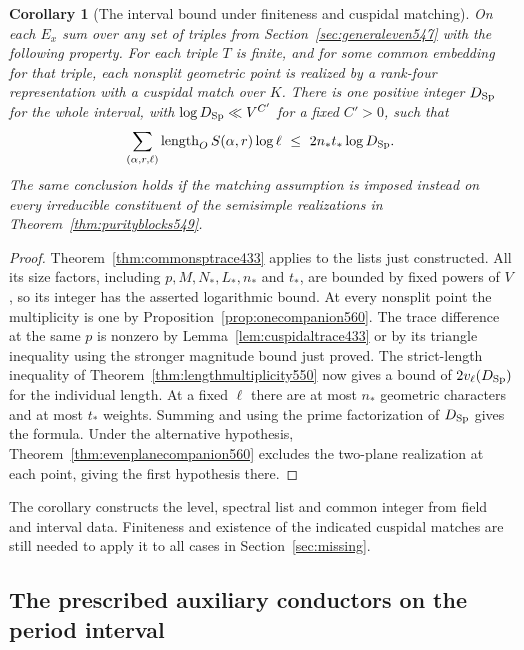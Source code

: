 \documentclass[a4paper,11pt]{article}
\newtheorem{corollary}[proposition]{Corollary}
\theoremstyle{definition}
\theoremstyle{remark}
\numberwithin{equation}{section}
\begin{document}
\begin{corollary}[The interval bound under finiteness and cuspidal matching]
\leavevmode\label{cor:uniformstrict561}
On each \(E_x\) sum over any set of triples from
Section~\ref{sec:generaleven547} with the following property.
For each triple \(T\) is finite, and for some common embedding
for that triple, each nonsplit geometric point is realized by
a rank-four representation with a cuspidal match over \(K\).
There is one positive integer \(D_{\rm Sp}\) for the whole
interval, with \(\log D_{\rm Sp}\ll V^{C'}\) for a fixed
\(C'>0\), such that
\[
 \sum_{(\alpha,r,\ell)}
     \operatorname{length}_O S(\alpha,r)\log\ell
                          \ \le\ 2n_*t_* \log D_{\rm Sp}.
\]
The same conclusion holds if the matching assumption is imposed
instead on every irreducible constituent of the semisimple
realizations in Theorem~\ref{thm:purityblocks549}.
\end{corollary}
\begin{proof}
Theorem~\ref{thm:commonsptrace433} applies to the lists just
constructed. All its size factors, including \(p,M,N_*,L_*,n_*\)
and \(t_*\), are bounded by fixed powers of \(V\), so its
integer has the asserted logarithmic bound. At every nonsplit
point the multiplicity is one by
Proposition~\ref{prop:onecompanion560}. The trace difference
at the same \(p\) is nonzero by Lemma~\ref{lem:cuspidaltrace433}
or by its triangle inequality using the stronger magnitude
bound just proved. The strict-length inequality of
Theorem~\ref{thm:lengthmultiplicity550} now gives a bound of
\(2v_\ell(D_{\rm Sp})\) for the individual length. At a
fixed \(\ell\) there are at most \(n_*\) geometric characters
and at most \(t_*\) weights. Summing and using the prime
factorization of \(D_{\rm Sp}\) gives the formula. Under the
alternative hypothesis, Theorem~\ref{thm:evenplanecompanion560}
excludes the two-plane realization at each point, giving the
first hypothesis there.
\end{proof}

The corollary constructs the level, spectral list and common
integer from field and interval data. Finiteness and existence
of the indicated cuspidal matches are still needed to apply it
to all cases in Section~\ref{sec:missing}.


\subsection{The prescribed auxiliary conductors on the period interval}
\label{sec:sourcelevels563}
\end{document}
